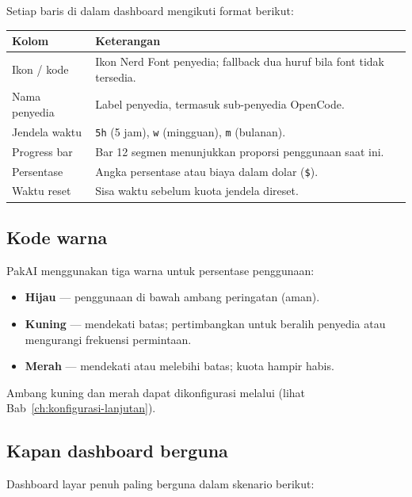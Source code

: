 Setiap baris di dalam dashboard mengikuti format berikut:

\begin{center}
\begin{tabular}{lp{10cm}}
\toprule
\textbf{Kolom} & \textbf{Keterangan} \\
\midrule
Ikon / kode & Ikon Nerd Font penyedia; fallback dua huruf bila font tidak tersedia. \\[4pt]
Nama penyedia & Label penyedia, termasuk sub-penyedia OpenCode. \\[4pt]
Jendela waktu & \texttt{5h} (5 jam), \texttt{w} (mingguan), \texttt{m} (bulanan). \\[4pt]
Progress bar & Bar 12 segmen menunjukkan proporsi penggunaan saat ini. \\[4pt]
Persentase & Angka persentase atau biaya dalam dolar (\texttt{\$}). \\[4pt]
Waktu reset & Sisa waktu sebelum kuota jendela direset. \\
\bottomrule
\end{tabular}
\end{center}

\subsection{Kode warna}

PakAI menggunakan tiga warna untuk persentase penggunaan:

\begin{itemize}
  \item \textbf{Hijau} — penggunaan di bawah ambang peringatan (aman).
  \item \textbf{Kuning} — mendekati batas; pertimbangkan untuk beralih penyedia
        atau mengurangi frekuensi permintaan.
  \item \textbf{Merah} — mendekati atau melebihi batas; kuota hampir habis.
\end{itemize}

Ambang kuning dan merah dapat dikonfigurasi melalui 
(lihat Bab~\ref{ch:konfigurasi-lanjutan}).

\subsection{Kapan dashboard berguna}

Dashboard layar penuh paling berguna dalam skenario berikut:

